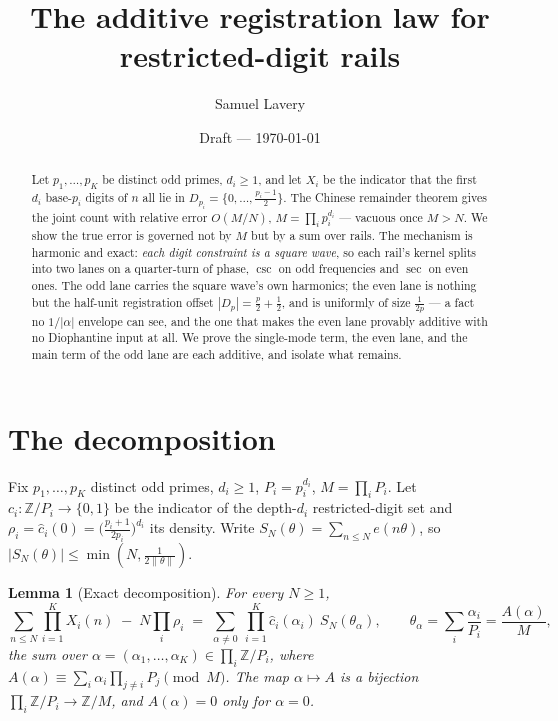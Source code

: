 \documentclass[11pt]{article}
\title{The additive registration law for restricted-digit rails}
\author{Samuel Lavery}
\date{Draft --- \today}
\newtheorem{lemma}[theorem]{Lemma}
\newcommand{\e}[1]{e\!\left(#1\right)}
\begin{document}
\maketitle

\begin{abstract}
Let $p_1,\dots,p_K$ be distinct odd primes, $d_i\ge1$, and let $X_i$ be the indicator
that the first $d_i$ base-$p_i$ digits of $n$ all lie in
$D_{p_i}=\{0,\dots,\frac{p_i-1}2\}$.  The Chinese remainder theorem gives the joint
count with relative error $O(M/N)$, $M=\prod_ip_i^{d_i}$ --- vacuous once $M>N$.  We
show the true error is governed not by $M$ but by a sum over rails.  The mechanism is
harmonic and exact: \emph{each digit constraint is a square wave}, so each rail's
kernel splits into two lanes on a quarter-turn of phase, $\csc$ on odd frequencies and
$\sec$ on even ones.  The odd lane carries the square wave's own harmonics; the even
lane is nothing but the half-unit registration offset $|D_p|=\frac p2+\frac12$, and is
uniformly of size $\frac1{2p}$ --- a fact no $1/|\alpha|$ envelope can see, and the one
that makes the even lane provably additive with no Diophantine input at all.  We prove
the single-mode term, the even lane, and the main term of the odd lane are each
additive, and isolate what remains.
\end{abstract}

\section{The decomposition}

Fix $p_1,\dots,p_K$ distinct odd primes, $d_i\ge1$, $P_i=p_i^{d_i}$, $M=\prod_iP_i$.
Let $c_i:\mathbb Z/P_i\to\{0,1\}$ be the indicator of the depth-$d_i$ restricted-digit
set and $\rho_i=\hat c_i(0)=\bigl(\frac{p_i+1}{2p_i}\bigr)^{d_i}$ its density.  Write
$S_N(\theta)=\sum_{n\le N}\e{n\theta}$, so $|S_N(\theta)|\le\min(N,\tfrac1{2\|\theta\|})$.

\begin{lemma}[Exact decomposition]\label{lem:dec}
For every $N\ge1$,
\[
\sum_{n\le N}\prod_{i=1}^K X_i(n)\;-\;N\prod_i\rho_i
\;=\;\sum_{\alpha\ne0}\ \prod_{i=1}^K\hat c_i(\alpha_i)\ S_N(\theta_\alpha),
\qquad
\theta_\alpha=\sum_i\frac{\alpha_i}{P_i}=\frac{A(\alpha)}{M},
\]
the sum over $\alpha=(\alpha_1,\dots,\alpha_K)\in\prod_i\mathbb Z/P_i$, where
$A(\alpha)\equiv\sum_i\alpha_i\prod_{j\ne i}P_j \pmod M$.  The map $\alpha\mapsto A$
is a bijection $\prod_i\mathbb Z/P_i\to\mathbb Z/M$, and $A(\alpha)=0$ only for
$\alpha=0$.
\end{lemma}
\end{document}
